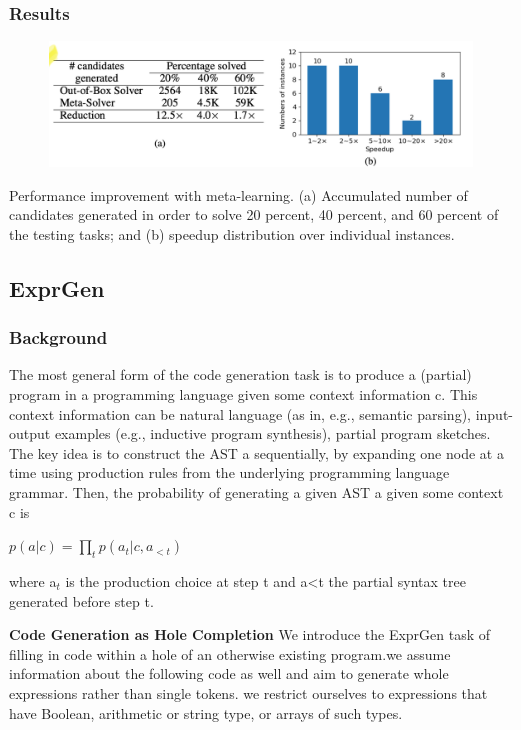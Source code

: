 \documentclass{article}
\begin{document}
\subsubsection{Results}
\begin{figure}[ht]
\vskip 0.2in
\begin{center}
\centerline{\includegraphics[width=\columnwidth]{Images/Synthesis1-3.png}}
\label{icml-historical}
\end{center}
\vskip -0.2in
\end{figure}
Performance improvement with meta-learning. (a) Accumulated number of candidates generated in order to solve 20 percent, 40 percent, and 60 percent of the testing tasks; and (b) speedup distribution over individual instances.
\subsection{ExprGen}
\subsubsection{Background}
The most general form of the code generation task is to produce a (partial) program in a programming language given some context information c. This context information can be natural language (as in, e.g., semantic parsing), input-output examples (e.g., inductive program synthesis), partial program sketches. The key idea is to construct the AST a sequentially, by expanding one node at a time using production rules from the underlying programming language grammar.  Then, the probability of generating a given AST a given some context c is

\begin{math}
p(a|c) = \prod_t p(a_t|c,a_{<t})
\end{math}

where a$_t$ is the production choice at step t and a<t the partial syntax tree generated before step t.

\textbf{Code Generation as Hole Completion} We introduce the ExprGen task of filling in code within a hole of an otherwise existing program.we assume information about the following code as well and aim to generate whole expressions rather than single tokens. we restrict ourselves to expressions that have Boolean, arithmetic or string type, or arrays of such types.
\end{document}
